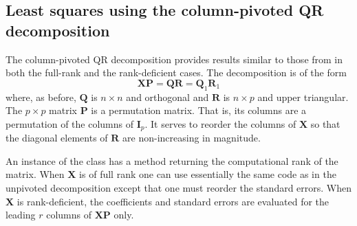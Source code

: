 \documentclass[shortnames,article,nojss]{jss}
\begin{document}

\subsection{Least squares using the column-pivoted QR decomposition}
\label{sec:colPivQR}

The column-pivoted QR decomposition provides results similar to those
from  in both the full-rank and the rank-deficient cases.
The decomposition is of the form
\begin{displaymath}
  \bm X\bm P=\bm Q\bm R=\bm Q_1\bm R_1
\end{displaymath}
where, as before, $\bm Q$ is $n\times n$ and orthogonal and $\bm R$ is
$n\times p$ and upper triangular.  The $p\times p$ matrix $\bm P$ is a
permutation matrix.  That is, its columns are a permutation of the
columns of $\bm I_p$.  It serves to reorder the columns of $\bm X$ so
that the diagonal elements of $\bm R$ are non-increasing in magnitude.

An instance of the class  has a
 method returning the computational rank of the matrix.
When $\bm X$ is of full rank one can use essentially the same code as
in the unpivoted decomposition except that one must reorder the
standard errors.  When $\bm X$ is rank-deficient, the
coefficients and standard errors are evaluated for the leading $r$ columns of $\bm
X\bm P$ only.
\end{document}
